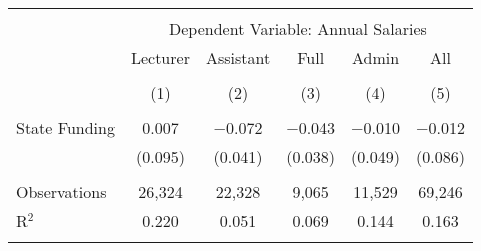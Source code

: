 
\begin{tabular}{@{\extracolsep{5pt}}lccccc} 
\\[-1.8ex]\hline 
\hline \\[-1.8ex] 
 & \multicolumn{5}{c}{Dependent Variable: Annual Salaries} \\ 
\cline{2-6} 
 & Lecturer & Assistant & Full & Admin & All \\ 
\\[-1.8ex] & (1) & (2) & (3) & (4) & (5)\\ 
\hline \\[-1.8ex] 
 State Funding & 0.007 & $-$0.072 & $-$0.043 & $-$0.010 & $-$0.012 \\ 
  & (0.095) & (0.041) & (0.038) & (0.049) & (0.086) \\ 
 \hline \\[-1.8ex] 
Observations & 26,324 & 22,328 & 9,065 & 11,529 & 69,246 \\ 
R$^{2}$ & 0.220 & 0.051 & 0.069 & 0.144 & 0.163 \\ 
\hline 
\hline \\[-1.8ex] 
\end{tabular} 
